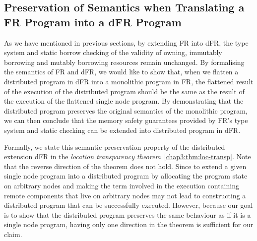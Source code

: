


\subsection{Preservation of Semantics when Translating a FR Program into a dFR Program}
\label{chap3:semantics:loc-transp}
As we have mentioned in previous sections, by extending FR into dFR, the type system and static borrow checking of the validity of owning, immutably borrowing and mutably borrowing resources remain unchanged. By formalising the semantics of FR and dFR, we would like to show that, when we flatten a distributed program in dFR into a monolithic program in FR, the flattened result of the execution of the distributed program should be the same as the result of the execution of the flattened single node program. By demonstrating that the distributed program preserves the original semantics of the monolithic program, we can then conclude that the memory safety guarantees provided by FR's type system and static checking can be extended into distributed program in dFR.

Formally, we state this semantic preservation property of the distributed extension dFR in the \emph{location transparency theorem}~\ref{chap3:thm:loc-transp}. Note that the reverse direction of the theorem does not hold. Since to extend a given single node program into a distributed program by allocating the program state on arbitrary nodes and making the term involved in the execution containing remote components that live on arbitrary nodes may not lead to constructing a distributed program that can be successfully executed. However, because our goal is to show that the distributed program preserves the same behaviour as if it is a single node program, having only one direction in the theorem is sufficient for our claim.

